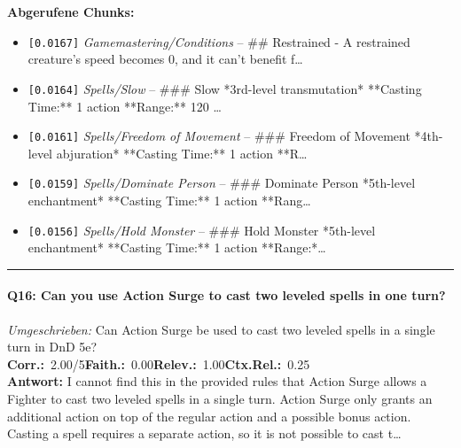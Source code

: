 \noindent\textbf{Abgerufene Chunks:}
\begin{itemize}[noitemsep, topsep=2pt]
  \item[\textbf{\#1}] \texttt{[0.0167]} \textit{Gamemastering/Conditions} -- \#\# Restrained  - A restrained creature's speed becomes 0, and it can't benefit f\ldots
  \item[\textbf{\#2}] \texttt{[0.0164]} \textit{Spells/Slow} -- \#\#\# Slow  *3rd-level transmutation*  **Casting Time:** 1 action  **Range:** 120 \ldots
  \item[\textbf{\#3}] \texttt{[0.0161]} \textit{Spells/Freedom of Movement} -- \#\#\# Freedom of Movement  *4th-level abjuration*  **Casting Time:** 1 action  **R\ldots
  \item[\textbf{\#4}] \texttt{[0.0159]} \textit{Spells/Dominate Person} -- \#\#\# Dominate Person  *5th-level enchantment*  **Casting Time:** 1 action  **Rang\ldots
  \item[\textbf{\#5}] \texttt{[0.0156]} \textit{Spells/Hold Monster} -- \#\#\# Hold Monster  *5th-level enchantment*  **Casting Time:** 1 action  **Range:*\ldots
\end{itemize}
\vspace{4pt}
\hrule
\vspace{6pt}

\paragraph{Q16: Can you use Action Surge to cast two leveled spells in one turn?}
\textit{Umgeschrieben:} Can Action Surge be used to cast two leveled spells in a single turn in DnD 5e?\\[2pt]
\noindent \textbf{Corr.:}~2.00/5\quad \textbf{Faith.:}~0.00\quad \textbf{Relev.:}~1.00\quad \textbf{Ctx.Rel.:}~0.25\\

\noindent\textbf{Antwort:} I cannot find this in the provided rules that Action Surge allows a Fighter to cast two leveled spells in a single turn. Action Surge only grants an additional action on top of the regular action and a possible bonus action. Casting a spell requires a separate action, so it is not possible to cast t\ldots

